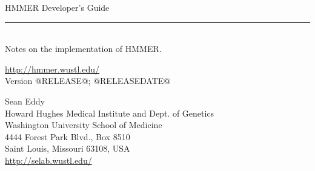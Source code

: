\begin{titlepage}
{\Large

\vspace*{\fill}

\noindent
{\Huge{HMMER Developer's Guide}} \\ 
\rule[2pt]{\textwidth}{1pt} \\
\hspace*{\fill} {\large {Notes on the implementation of HMMER.} \\ }

\vspace*{\fill}

\begin{center}
\url{http://hmmer.wustl.edu/}\\
Version @RELEASE@; @RELEASEDATE@ \\

\vspace*{\fill}

Sean Eddy\\
Howard Hughes Medical Institute and Dept. of Genetics\\
Washington University School of Medicine\\
4444 Forest Park Blvd., Box 8510\\
Saint Louis, Missouri 63108, USA\\
\url{http://selab.wustl.edu/}\\
\end{center}

\vspace*{\fill}
}
\end{titlepage}
